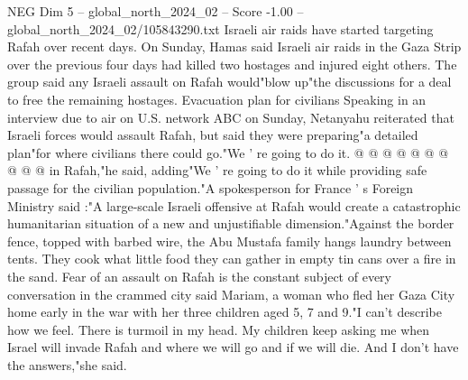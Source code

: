 \begin{textsample}{NEG Dim 5 – global\_north\_2024\_02 – Score -1.00 – global\_north\_2024\_02/105843290.txt}
Israeli air raids have started targeting Rafah over recent days.
On Sunday, Hamas said Israeli air raids in the Gaza Strip over the previous four days had killed two hostages and injured eight others.
The group said any Israeli assault on Rafah would"blow up"the discussions for a deal to free the remaining hostages.
Evacuation plan for civilians Speaking in an interview due to air on U.S. network ABC on Sunday, Netanyahu reiterated that Israeli forces would assault Rafah, but said they were preparing"a detailed plan"for where civilians there could go."We ' re going to do it. @ @ @ @ @ @ @ @ @ @ in Rafah,"he said, adding"We ' re going to do it while providing safe passage for the civilian population."A spokesperson for France ' s Foreign Ministry said :"A large-scale Israeli offensive at Rafah would create a catastrophic humanitarian situation of a new and unjustifiable dimension."Against the border fence, topped with barbed wire, the Abu Mustafa family hangs laundry between tents.
They cook what little food they can gather in empty tin cans over a fire in the sand.
Fear of an assault on Rafah is the constant subject of every conversation in the crammed city said Mariam, a woman who fled her Gaza City home early in the war with her three children aged 5, 7 and 9."I can't describe how we feel.
There is turmoil in my head.
My children keep asking me when Israel will invade Rafah and where we will go and if we will die.
And I don't have the answers,"she said.

\end{textsample}

